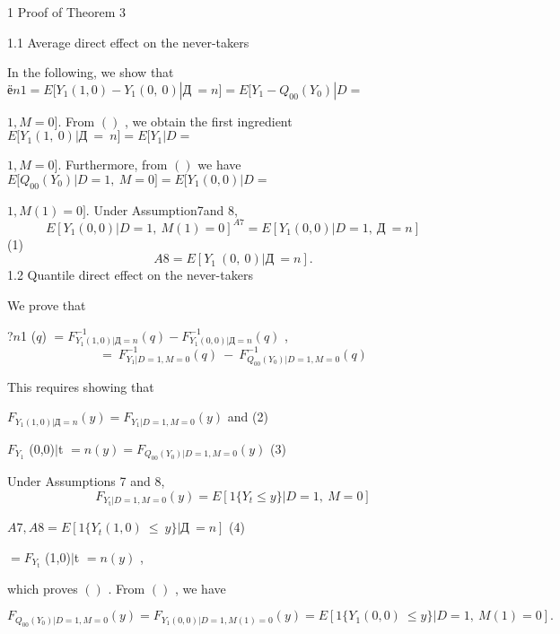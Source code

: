 \documentclass[a4paper,12pt]{article}
\begin{document}
1 Proof of Theorem 3

1.1 Average direct effect on the never-takers

In the following, we show that $ё n1=E[Y_{1}(1,0)-Y_{1}(0,\ 0)|Д\ =n]=E[Y_{1}-Q_{00}(Y_{0})|D=$

$1, M = 0]$. From $()$ , we obtain the first ingredient $E[Y_{1}(1,\ 0)|Д\ =\ n] = E[Y_{1}|D =$

$1, M=0]$. Furthermore, from $()$ we have $E[Q_{00}(Y_{0})|D=1,\ M=0]=E[Y_{1}(0,0)|D=$

$1, M(1)=0]$. Under Assumption7and 8,
$$
E[Y_{1}(0,0)|D=1,\ M(1)=0]^{A7}=E[Y_{1}(0,0)|D=1,\ Д\ =n]
$$
(1)
$$
A8=E[Y_{1}\ (0,\ 0)|Д\ =n].
$$
1.2 Quantile direct effect on the never-takers

We prove that
\begin{center}
?$n$1 ($q$) $= F_{Y_{1}(1,0)|Д=n}^{-1}(q) - F_{Y_{1}(0,0)|Д=n}^{-1}(q)$ ,
$$
=\ F_{Y_{1}|D=1,M=0}^{-1}(q)\ -\ F_{Q_{00}(Y_{0})|D=1,M=0}^{-1}(q)
$$
\end{center}
This requires showing that
\begin{center}
$F_{Y_{1}(1,0)|Д=n}(y)=F_{Y_{1}|D=1,M=0}(y)$ and   (2)

$F_{Y_{1}}$ (0,0)$|$t $=n(y) = F_{Q_{00}(Y_{0})|D=1,M=0}(y)$   (3)
\end{center}
Under Assumptions 7 and 8,
$$
F_{Y_{\mathrm{t}}|D=1,M=0}(y)=E[1\{Y_{t}\leq y\}|D=1,\ M=0]
$$
\begin{center}
$A7,A8=E[1\{Y_{t}(1,0)\ \leq\ y\}|Д\ =n]$   (4)

$= F_{Y_{\mathrm{t}}}$ (1,0)$|$t $=n(y)$ ,
\end{center}
which proves $()$ . From $()$ , we have

$F_{Q_{00}(Y_{0})|D=1,M=0}(y)=F_{Y_{1}(0,0)|D=1,M(1)=0}(y)=E[1\{Y_{1}(0,0)\ \leq y\}|D=1,\ M(1)=0].$
\end{document}
